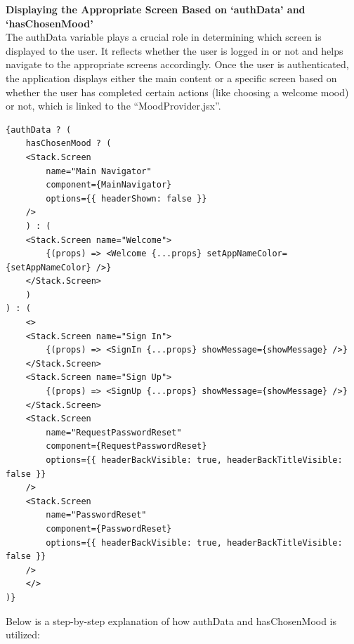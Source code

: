 \vspace{5mm}

\noindent \textbf{Displaying the Appropriate Screen Based on `authData' and `hasChosenMood'} \\
The authData variable plays a crucial role in determining which screen is displayed to the user. It reflects whether the user is logged in or not and helps navigate to the appropriate screens accordingly. Once the user is authenticated, the application displays either the main content or a specific screen based on whether the user has completed certain actions (like choosing a welcome mood) or not, which is linked to the ``MoodProvider.jsx''.

\begin{lstlisting}[caption=Authentication Navigation]
{authData ? (
    hasChosenMood ? (
    <Stack.Screen
        name="Main Navigator"
        component={MainNavigator}
        options={{ headerShown: false }}
    />
    ) : (
    <Stack.Screen name="Welcome">
        {(props) => <Welcome {...props} setAppNameColor={setAppNameColor} />}
    </Stack.Screen>
    )
) : (
    <>
    <Stack.Screen name="Sign In">
        {(props) => <SignIn {...props} showMessage={showMessage} />}
    </Stack.Screen>
    <Stack.Screen name="Sign Up">
        {(props) => <SignUp {...props} showMessage={showMessage} />}
    </Stack.Screen>
    <Stack.Screen
        name="RequestPasswordReset"
        component={RequestPasswordReset}
        options={{ headerBackVisible: true, headerBackTitleVisible: false }}
    />
    <Stack.Screen
        name="PasswordReset"
        component={PasswordReset}
        options={{ headerBackVisible: true, headerBackTitleVisible: false }}
    />
    </>
)}
\end{lstlisting}

\noindent Below is a step-by-step explanation of how authData and hasChosenMood is utilized:

